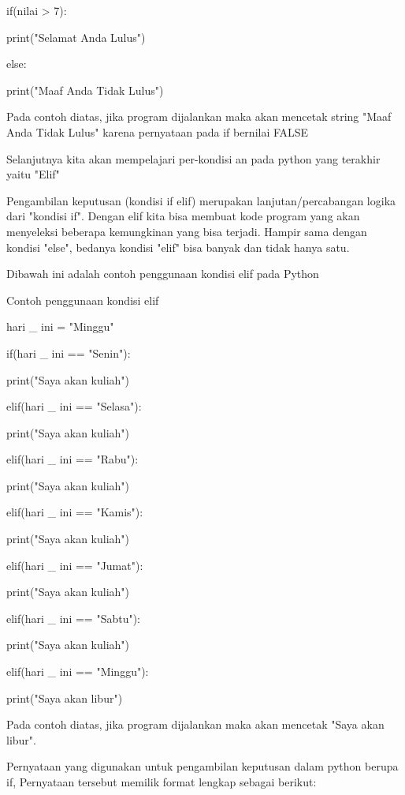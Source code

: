  
if(nilai > 7):
        
 
 print("Selamat Anda Lulus")
 
 
else:
 
 
        print("Maaf Anda Tidak Lulus") 
 


Pada contoh diatas, jika program dijalankan maka akan mencetak string "Maaf Anda Tidak Lulus" karena pernyataan pada if bernilai FALSE 
 

Selanjutnya kita akan mempelajari per-kondisi an pada python yang terakhir yaitu "Elif"    

 
Pengambilan keputusan (kondisi if elif) merupakan lanjutan/percabangan logika dari "kondisi if". Dengan elif kita bisa membuat kode program yang akan menyeleksi beberapa kemungkinan yang bisa terjadi. Hampir sama dengan kondisi "else", bedanya kondisi "elif" bisa banyak dan tidak hanya satu.   

Dibawah ini adalah contoh penggunaan kondisi elif pada Python 

 
Contoh penggunaan kondisi elif 

 
hari   \_  ini = "Minggu" 
 


if(hari   \_  ini == "Senin"): 
 

        print("Saya akan kuliah") 
 

elif(hari   \_  ini == "Selasa"): 
 

        print("Saya akan kuliah") 
 

elif(hari   \_  ini == "Rabu"): 
 

        print("Saya akan kuliah") 
 

elif(hari   \_  ini == "Kamis"): 
 

        print("Saya akan kuliah") 
 

elif(hari   \_  ini == "Jumat"): 
 

        print("Saya akan kuliah") 
 

elif(hari   \_  ini == "Sabtu"): 
 

        print("Saya akan kuliah") 
 

elif(hari   \_  ini == "Minggu"): 
 

        print("Saya akan libur") 
 


Pada contoh diatas, jika program dijalankan maka akan mencetak   
"Saya akan libur". 
 
   Pernyataan yang digunakan untuk pengambilan keputusan dalam python berupa if, Pernyataan tersebut memilik format lengkap sebagai berikut: 


